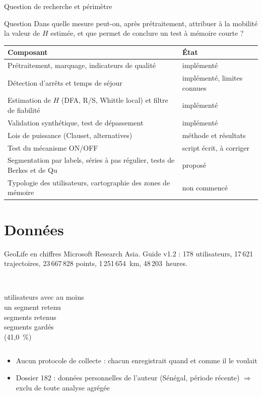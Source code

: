 \documentclass[aspectratio=169,11pt]{beamer}
\begin{document}
\begin{frame}{Question de recherche et périmètre}
\begin{block}{Question}
Dans quelle mesure peut-on, après prétraitement, attribuer à la mobilité la valeur de $H$ estimée, et que permet de conclure un test à mémoire courte ?
\end{block}
\footnotesize
\begin{tabular}{@{}p{8.2cm}l@{}}
\toprule
Composant & État \\
\midrule
Prétraitement, marquage, indicateurs de qualité & implémenté \\
Détection d'arrêts et temps de séjour & implémenté, limites connues \\
Estimation de $H$ (DFA, R/S, Whittle local) et filtre de fiabilité & implémenté \\
Validation synthétique, test de dépassement & implémenté \\
Lois de puissance (Clauset, alternatives) & méthode et résultats \\
Test du mécanisme ON/OFF & script écrit, à corriger \\
Segmentation par labels, séries à pas régulier, tests de Berkes et de Qu & proposé \\
Typologie des utilisateurs, cartographie des zones de mémoire & non commencé \\
\bottomrule
\end{tabular}
\end{frame}

\section{Données}

\begin{frame}{GeoLife en chiffres}
Microsoft Research Asia. Guide v1.2 : 178 utilisateurs, 17\,621 trajectoires, 23\,667\,828 points, 1\,251\,654~km, 48\,203~heures.
\bigskip
\begin{columns}[c]
\\[1mm] utilisateurs avec au moins\\ un segment retenu
\\[1mm] segments retenus
\\[1mm] segments \og gardés \fg{}\\ (41,0~\%)
\end{columns}
\bigskip
\begin{itemize}
  \item Aucun protocole de collecte : chacun enregistrait quand et comme il le voulait
  \item Dossier 182 : données personnelles de l'auteur (Sénégal, période récente) \(\Rightarrow\) \alert{exclu} de toute analyse agrégée
\end{itemize}
\end{frame}
\end{document}
